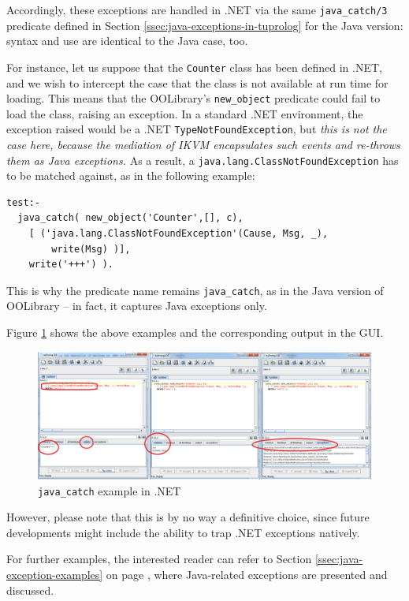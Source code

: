 Accordingly, these exceptions are handled in \tuprolog{}.NET via the same \texttt{java\_catch/3} predicate defined in Section \ref{ssec:java-exceptions-in-tuprolog} for the Java version: syntax and use are identical to the Java case, too.

For instance, let us suppose that the \texttt{Counter} class has been defined in .NET, and we wish to intercept the case that the class is not available at run time for loading. This means that the OOLibrary's \texttt{new\_object} predicate could fail to load the class, raising an exception.
In a standard .NET environment, the exception raised would be a .NET \texttt{TypeNotFoundException}, but \textit{this is not the case here, because the mediation of IKVM encapsulates such events and re-throws them as Java exceptions.}
As a result, a \texttt{java.lang.ClassNotFoundException} has to be matched against, as in the following example:

\begin{verbatim}
test:-
  java_catch( new_object('Counter',[], c),
    [ ('java.lang.ClassNotFoundException'(Cause, Msg, _),
        write(Msg) )],
    write('+++') ).
\end{verbatim}
%
This is why the predicate name remains \texttt{java\_catch}, as in the Java version of OOLibrary -- in fact, it captures Java exceptions only.

Figure \ref{fig:dotnet-exceptions} shows the above examples and the corresponding output in the \tuprolog{} GUI.
%
\begin{figure}
\centering
  \includegraphics[width=12cm]{images/dotnet-exceptions}
  \caption{\texttt{java\_catch} example in .NET}\label{fig:dotnet-exceptions}
\end{figure}
%
However, please note that this is by no way a definitive choice, since future developments might include the ability to trap .NET exceptions natively.

For further examples, the interested reader can refer to Section \ref{ssec:java-exception-examples} on page \pageref{ssec:java-exception-examples}, where Java-related exceptions are presented and discussed.




